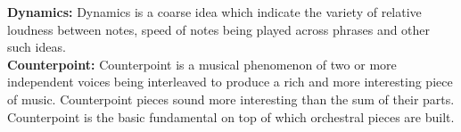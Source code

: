 \noindent \textbf{Dynamics:} Dynamics is a coarse idea which indicate the variety of relative loudness between notes, speed of notes being played across phrases and other such ideas. \\

\noindent \textbf{Counterpoint: } Counterpoint is a musical phenomenon of two or more independent voices being interleaved to produce a rich and more interesting piece of music. Counterpoint pieces sound more interesting than the sum of their parts. Counterpoint is the basic fundamental on top of which orchestral pieces are built. 